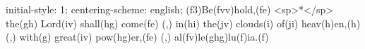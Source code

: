 initial-style: 1;
centering-scheme: english;
(f3)Be(fvv)hold,(fe) <sp>*</sp> the(gh) Lord(iv) shall(hg) come(fe) (,) in(hi) the(jv) clouds(i) of(ji) heav(h)en,(h) (,) with(g) great(iv) pow(hg)er,(fe) (,) al(fv)le(ghg)lu(f)ia.(f)
